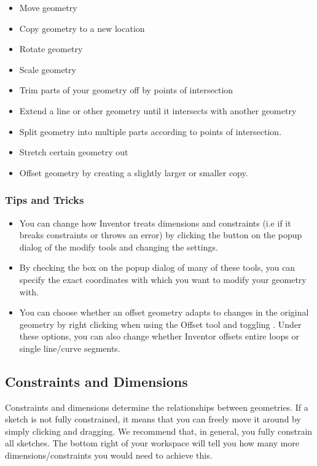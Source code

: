 \begin{itemize}
\item Move geometry
\item Copy geometry to a new location
\item Rotate geometry
\item Scale geometry
\item Trim parts of your geometry off by points of intersection
\item Extend a line or other geometry until it intersects with another geometry
\item Split geometry into multiple parts according to points of intersection.
\item Stretch certain geometry out
\item Offset geometry by creating a slightly larger or smaller copy.
\end{itemize}

\subsubsection{Tips and Tricks}
\begin{itemize}
\item You can change how Inventor treats dimensions and constraints (i.e if it breaks constraints or throws an error) by clicking the \appcommand{\textgreater \textgreater} button on the popup dialog of the modify tools and changing the settings.
\item By checking the  box on the popup dialog of many of these tools, you can specify the exact coordinates with which you want to modify your geometry with.
\item You can choose whether an offset geometry adapts to changes in the original geometry by right clicking when using the Offset tool and toggling . Under these options, you can also change whether Inventor offsets entire loops or single line/curve segments.
\end{itemize}

\subsection{Constraints and Dimensions}
\label{chap:constraints}
Constraints and dimensions determine the relationships between geometries. If a sketch is not fully constrained, it means that you can freely move it around by simply clicking and dragging. We recommend that, in general, you fully constrain all sketches. The bottom right of your workspace will tell you how many more dimensions/constraints you would need to achieve this.


